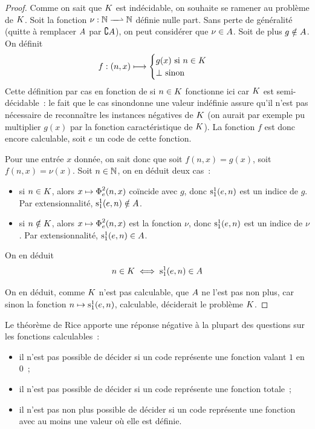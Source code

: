 \begin{proof}
  Comme on sait que $K$ est indécidable, on souhaite se ramener au problème de
  $K$. Soit la fonction $\makeFunNamePartial{\nu}{\bN}{\bN}$ définie nulle
  part. Sans perte de généralité (quitte à remplacer $A$ par
  $\complement A$), on peut considérer que $\nu \in A$. Soit de plus
  $g \notin A$. On définit
  \[f : (n,x) \longmapsto
  \begin{cases}
    g(x) \text{ si } n \in K\\
    \bot \text{ sinon}
  \end{cases}\]
  Cette définition par cas en fonction de si $n \in K$ fonctionne ici car
  $K$ est semi-décidable~: le fait que le cas \og sinon\fg donne une valeur
  indéfinie assure qu'il n'est pas nécessaire de reconnaître les instances
  négatives de $K$ (on aurait par exemple pu multiplier $g(x)$ par la fonction
  caractéristique de $K$). La fonction $f$ est donc encore calculable, soit
  $e$ un code de cette fonction.

  Pour une entrée $x$ donnée, on sait donc que soit $f(n,x) = g(x)$, soit
  $f(n,x) = \nu(x)$. Soit $n \in \mathbb N$, on en déduit deux cas~:
  \begin{itemize}
  \item si $n \in K$, alors $x \mapsto \operatorname{\Phi}_{e}^{2}(n,x)$ coïncide avec
    $g$, donc $\mathrm{s}_{1}^{1}(e,n)$ est un indice de $g$. Par extensionnalité,
    $\mathrm{s}_{1}^{1}(e,n) \notin A$.
  \item si $n \notin K$, alors $x \mapsto \operatorname{\Phi}_{e}^{2}(n,x)$ est la fonction
    $\nu$, donc $\mathrm{s}_{1}^{1}(e,n)$ est un indice de $\nu$. Par extensionnalité,
    $\mathrm{s}_{1}^{1}(e,n) \in A$.
  \end{itemize}
  On en déduit
  \[n \in K \iff \mathrm{s}_{1}^{1}(e,n) \in A\]

  On en déduit, comme $K$ n'est pas calculable, que $A$ ne l'est pas non
  plus, car sinon la fonction $n \mapsto \mathrm{s}_{1}^{1}(e,n)$, calculable,
  déciderait le problème $K$.
\end{proof}

Le théorème de Rice apporte une réponse négative à la plupart des questions
sur les fonctions calculables~:
\begin{itemize}
\item il n'est pas possible de décider si un code représente une fonction valant
  $1$ en $0$~;
\item il n'est pas possible de décider si un code représente une fonction
  totale~;
\item il n'est pas non plus possible de décider si un code représente une
  fonction avec au moins une valeur où elle est définie.
\end{itemize}

